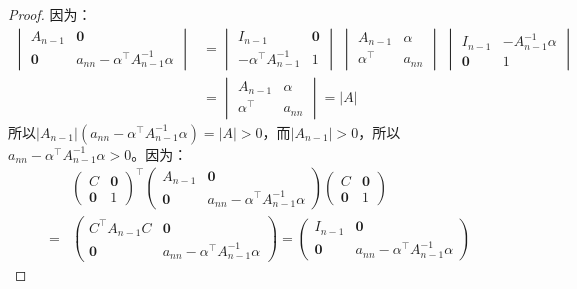 \begin{proof}
	因为：
	\begin{align*}
		\begin{vmatrix}
			A_{n-1} & \mathbf{0} \\
			\mathbf{0} & a_{nn}-\alpha^{\top}A_{n-1}^{-1}\alpha
		\end{vmatrix}
		&=
		\begin{vmatrix}
			I_{n-1} & \mathbf{0} \\
			-\alpha^{\top}A_{n-1}^{-1} & 1
		\end{vmatrix}\;
		\begin{vmatrix}
			A_{n-1} & \alpha \\
			\alpha^{\top} & a_{nn}
		\end{vmatrix}\;
		\begin{vmatrix}
			I_{n-1} & -A_{n-1}^{-1}\alpha \\
			\mathbf{0} & 1
		\end{vmatrix} \\
		&=
		\begin{vmatrix}
			A_{n-1} & \alpha \\
			\alpha^{\top} & a_{nn}
		\end{vmatrix}
		=|A|
	\end{align*}
	所以$|A_{n-1}|(a_{nn}-\alpha^{\top}A_{n-1}^{-1}\alpha)=|A|>0$，而$|A_{n-1}|>0$，所以$a_{nn}-\alpha^{\top}A_{n-1}^{-1}\alpha>0$。因为：
	\begin{align*}
		&
		\begin{pmatrix}
			C & \mathbf{0} \\
			\mathbf{0} & 1
		\end{pmatrix}^{\top}
		\begin{pmatrix}
			A_{n-1} & \mathbf{0} \\
			\mathbf{0} & a_{nn}-\alpha^{\top}A_{n-1}^{-1}\alpha
		\end{pmatrix}
		\begin{pmatrix}
			C & \mathbf{0} \\
			\mathbf{0} & 1
		\end{pmatrix} \\
		=&
		\begin{pmatrix}
			C^{\top}A_{n-1}C & \mathbf{0} \\
			\mathbf{0} & a_{nn}-\alpha^{\top}A_{n-1}^{-1}\alpha
		\end{pmatrix}
		=
		\begin{pmatrix}
			I_{n-1} & \mathbf{0} \\
			\mathbf{0} & a_{nn}-\alpha^{\top}A_{n-1}^{-1}\alpha
		\end{pmatrix}

\end{align*}
\end{proof}
